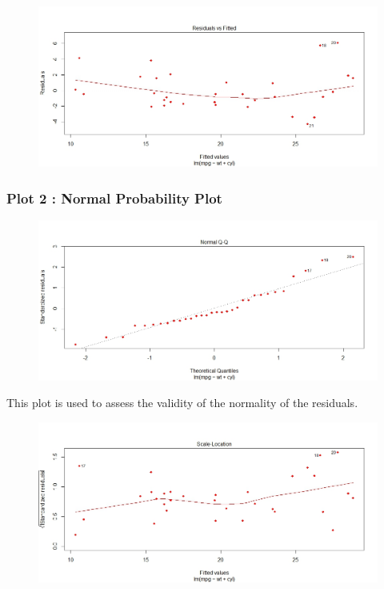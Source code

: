 \documentclass[residuals.tex]{subfiles}
\begin{document}
\begin{figure}[h!]
	\centering
	\includegraphics[width=0.95\linewidth]{./mtcarsDiagPlot1}
	
	\label{mtcarsDiagPlot1}
\end{figure}

\newpage
\subsubsection*{Plot 2 : Normal Probability Plot}
\begin{figure}[h!]
	\centering
	\includegraphics[width=0.95\linewidth]{./mtcarsDiagPlot2}
	
	\label{mtcarsDiagPlot2}
\end{figure}


This plot is used to assess the validity of the normality of the residuals.
\begin{figure}[h!]
	\centering
	\includegraphics[width=0.95\linewidth]{./mtcarsDiagPlot3}
	
	\label{mtcarsDiagPlot3}
\end{figure}
\end{document}
